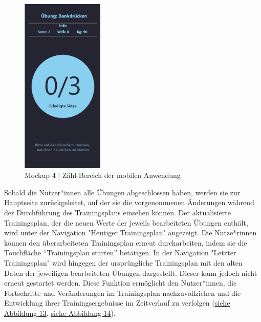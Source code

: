 \begin{figure}[!htb]
    \centering
    \includegraphics[width=0.35\textwidth]{pics/count4.png}
    \caption{Mockup 4 | Zähl-Bereich der mobilen Anwendung}
    \label{fig:count4}
\end{figure}
\FloatBarrier

Sobald die Nutzer*innen alle Übungen abgeschlossen haben, werden sie zur Hauptseite zurückgeleitet, auf der sie die vorgenommenen Änderungen während der Durchführung des Trainingsplans einsehen können. Der aktualisierte Trainingsplan, der die neuen Werte der jeweils bearbeiteten Übungen enthält, wird unter der Navigation "Heutiger Trainingsplan" angezeigt. Die Nutze*rinnen können den überarbeiteten Trainingsplan erneut durcharbeiten, indem sie die Touchfläche {``Trainingsplan starten''} betätigen.
\newline
\newline
In der Navigation "Letzter Trainingsplan" wird hingegen der ursprüngliche Trainingsplan mit den alten Daten der jeweiligen bearbeiteten Übungen dargestellt. Dieser kann jedoch nicht erneut gestartet werden. Diese Funktion ermöglicht den Nutzer*innen, die Fortschritte und Veränderungen im Trainingsplan nachzuvollziehen und die Entwicklung ihrer Trainingsergebnisse im Zeitverlauf zu verfolgen (\hyperref[fig:finished3]{siehe Abbildung 13}, \hyperref[fig:finished4]{siehe Abbildung 14}).

